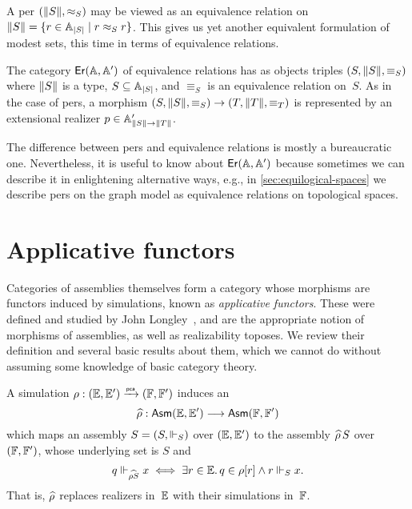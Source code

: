 A per $(\T{S}, {\per_S})$ may be viewed as an equivalence relation on
$\|S\| = \set{r \in \xAtyp{S} \such r \per_S r}$. This gives us yet
another equivalent formulation of modest sets, this time in terms of
equivalence relations.

The category $\Er{\AA, \subAA}$ of equivalence relations has as objects triples $(S, \T{S}, {\equiv_S})$ where $\T{S}$ is a
type, $S \subseteq \xAtyp{S}$, and $\equiv_S$ is an equivalence relation on~$S$. As in the case of pers, a morphism
$(S, \T{S}, {\equiv_S}) \to (T, \T{T}, {\equiv_T})$ is represented by an extensional realizer
$p \in \subAtyp{\T{S} \to \T{T}}$.

The difference between pers and equivalence relations is mostly a
bureaucratic one. Nevertheless, it is useful to know about $\Er{\AA,
  \subAA}$ because sometimes we can describe it in enlightening
alternative ways, e.g., in \cref{sec:equilogical-spaces} we
describe pers on the graph model as equivalence relations on
topological spaces.

\section{Applicative functors}
\label{sec:applicative-functors}


%
%

Categories of assemblies themselves form a category whose morphisms are functors induced by simulations, known as \emph{applicative functors}. These were defined and studied by John Longley~\cite{Longley:94}, and are the appropriate notion of morphisms of assemblies, as well as realizability toposes. We review their definition and several basic results about them, which we cannot do without assuming some knowledge of basic category theory.

A simulation $\rho: (\EE, \subEE) \pcato (\FF, \subFF)$ induces an 
%
\begin{equation*}
  \ff{\rho}: \Asm{\EE, \subEE} \longrightarrow \Asm{\FF, \subFF}
\end{equation*}
%
which maps an assembly $S = (S, {\rz[S]})$ over $(\EE, \subEE)$ to the assembly
$\ff{\rho} \, S$ over $(\FF, \subFF)$, whose underlying set is $S$ and
%
\begin{align*}
  q \rz[\ff{\rho S}] x
  \iff \some{r \in \EE} q \in \rho[r] \land r \rz[S] x.
\end{align*}
%
That is, $\ff{\rho}$ replaces realizers in~$\EE$ with their simulations in~$\FF$.

